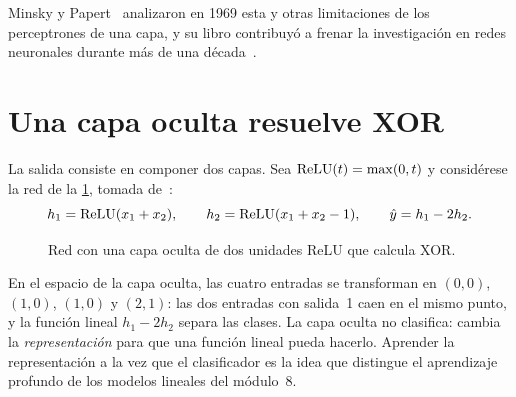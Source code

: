 Minsky y Papert~\cite{minsky} analizaron en 1969 esta y otras limitaciones de los perceptrones de una capa, y su libro contribuyó a frenar la investigación en redes neuronales durante más de una década~\cite[cap.~1]{gbc}.

\section{Una capa oculta resuelve XOR}

La salida consiste en componer dos capas. Sea $\operatorname{ReLU}(t)=\max(0,t)$ y considérese la red de la \cref{fig:xor}, tomada de~\cite[§6.1]{gbc}:
\begin{equation}\label{eq:xor}
h_1=\operatorname{ReLU}(x_1+x_2),\qquad h_2=\operatorname{ReLU}(x_1+x_2-1),\qquad \hat y=h_1-2h_2.
\end{equation}

\begin{figure}[h]
\centering
{}
\caption{Red con una capa oculta de dos unidades ReLU que calcula XOR.}\label{fig:xor}
\end{figure}

En el espacio de la capa oculta, las cuatro entradas se transforman en $(0,0)$, $(1,0)$, $(1,0)$ y $(2,1)$: las dos entradas con salida~1 caen en el mismo punto, y la función lineal $h_1-2h_2$ separa las clases. La capa oculta no clasifica: cambia la \emph{representación} para que una función lineal pueda hacerlo. Aprender la representación a la vez que el clasificador es la idea que distingue el aprendizaje profundo de los modelos lineales del módulo~8.


